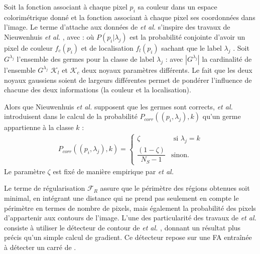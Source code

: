 Soit  la fonction associant à chaque pixel $p_{i}$ sa couleur dans un espace colorimétrique donné et  la fonction associant à chaque pixel ses coordonnées dans l'image. Le terme d'attache aux données   de  \textit{et al.} \cite{muller2016robust} s'inspire des travaux de Nieuwenhuis \textit{et al.} \cite{nieuwenhuis2013spatially}, avec :
où $P(p_{i} | \lambda_{j})$ est la probabilité conjointe d'avoir un pixel de couleur $f_{c}(p_{i})$ et de localisation $f_{l}(p_{i})$ sachant que le label $\lambda_{j}$ .  Soit $G^{\lambda_{j}}$ l'ensemble des germes pour la classe de label $\lambda_{j}$ : 
avec $|G^{\lambda_{j}}|$  la cardinalité de l'ensemble $G^{\lambda_{j}}$\modif{,} $\mathcal{K}_{l}$ et $\mathcal{K}_{c}$ deux noyaux  paramètres différents. Le fait que les deux noyaux gaussiens soient de largeurs différentes permet de pondérer l'influence de chacune des deux informations (la couleur et la localisation).

Alors que Nieuwenhuis \textit{et al.} \cite{nieuwenhuis2013spatially} supposent que les germes sont corrects,   \textit{et al.} introduisent dans le calcul de   la probabilité $P_{corr}((p_{i},\lambda_{j}), k)$ qu'un germe appartienne  à la classe $k$ :
\begin{align*}
P_{corr}((p_{i},\lambda_{j}), k)=  \begin{cases}
\zeta &\text{ si } \lambda_{j}=k \\
\dfrac{(1 - \zeta)}{N_{S} -1} &\text{sinon.}
\end{cases} 
\end{align*}
Le paramètre  $\zeta$ est  fixé de manière empirique par  \textit{et al.}
 
Le terme de régularisation $\mathcal{F}_{R}$ assure que le périmètre des régions obtenues soit minimal, en intégrant une distance qui ne prend pas seulement en compte le périmètre en termes de nombre de pixels, mais également la probabilité des pixels d'appartenir aux contours de l'image. L'une des particularité des travaux de  \textit{et al.} \cite{muller2016robust} consiste à utiliser le détecteur de contour de  \textit{et al.} \cite{dollar2015fast}, donnant un résultat plus précis qu'un simple calcul de gradient. Ce détecteur repose sur  une FA entraînée à  détecter un carré de . 

